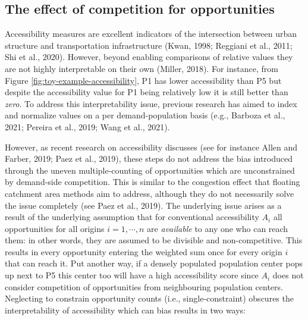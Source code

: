 \documentclass[]{elsarticle} %
\begin{document}
\hypertarget{the-effect-of-competition-for-opportunities}{%
\subsection{The effect of competition for
opportunities}\label{the-effect-of-competition-for-opportunities}}

Accessibility measures are excellent indicators of the intersection
between urban structure and transportation infrastructure (Kwan, 1998;
Reggiani et al., 2011; Shi et al., 2020). However, beyond enabling
comparisons of relative values they are not highly interpretable on
their own (Miller, 2018). For instance, from Figure
\ref{fig:toy-example-accessibility}, P1 has lower accessibility than P5
but despite the accessibility value for P1 being relatively low it is
still better than \emph{zero}. To address this interpretability issue,
previous research has aimed to index and normalize values on a per
demand-population basis (e.g., Barboza et al., 2021; Pereira et al.,
2019; Wang et al., 2021).

However, as recent research on accessibility discusses (see for instance
Allen and Farber, 2019; Paez et al., 2019), these steps do not address
the bias introduced through the uneven multiple-counting of
opportunities which are unconstrained by demand-side competition. This
is similar to the congestion effect that floating catchment area methods
aim to address, although they do not necessarily solve the issue
completely (see Paez et al., 2019). The underlying issue arises as a
result of the underlying assumption that for conventional accessibility
\(A_i\) all opportunities for all origins \(i=1,\cdots,n\) are
\emph{available} to any one who can reach them: in other words, they are
assumed to be divisible and non-competitive. This results in every
opportunity entering the weighted sum once for every origin \(i\) that
can reach it. Put another way, if a densely populated population center
pops up next to P5 this center too will have a high accessibility score
since \(A_i\) does not consider competition of opportunities from
neighbouring population centers. Neglecting to constrain opportunity
counts (i.e., single-constraint) obscures the interpretability of
accessibility which can bias results in two ways:
\end{document}
